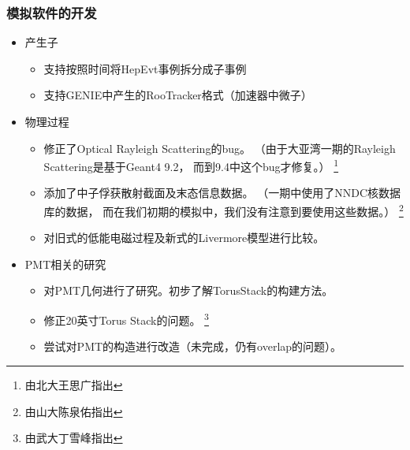 \begin{frame}
    \frametitle{模拟软件的开发}
    \begin{itemize}
        \item 产生子
            \begin{itemize}
                \item 支持按照时间将HepEvt事例拆分成子事例
                \item 支持GENIE中产生的RooTracker格式（加速器中微子）
            \end{itemize}
        \item 物理过程
            \begin{itemize}
                \item 修正了Optical Rayleigh Scattering的bug。
                      （由于大亚湾一期的Rayleigh Scattering是基于Geant4 9.2，
                       而到9.4中这个bug才修复。）
                       \footnote{由北大王思广指出}
                \item 添加了中子俘获散射截面及末态信息数据。
                      （一期中使用了NNDC核数据库的数据，
                      而在我们初期的模拟中，我们没有注意到要使用这些数据。）
                       \footnote{由山大陈泉佑指出}
                \item 对旧式的低能电磁过程及新式的Livermore模型进行比较。
            \end{itemize}
        \item PMT相关的研究
            \begin{itemize}
                \item 对PMT几何进行了研究。初步了解TorusStack的构建方法。
                \item 修正20英寸Torus Stack的问题。
                      \footnote{由武大丁雪峰指出}
                \item 尝试对PMT的构造进行改造（未完成，仍有overlap的问题）。
            \end{itemize}
    \end{itemize}
\end{frame}

